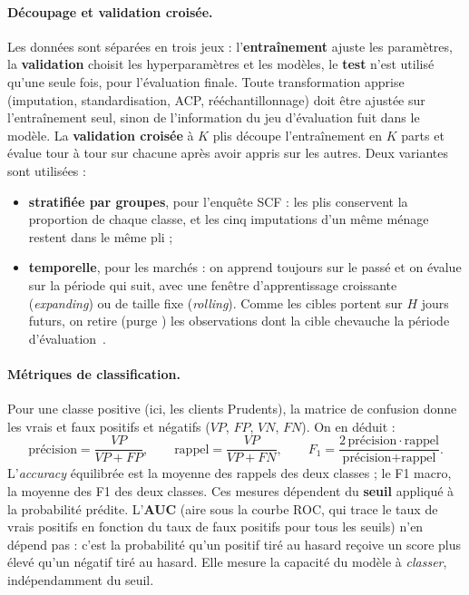 \paragraph{Découpage et validation croisée.} Les données sont séparées en trois jeux : l'\textbf{entraînement} ajuste les paramètres, la \textbf{validation} choisit les hyperparamètres et les modèles, le \textbf{test} n'est utilisé qu'une seule fois, pour l'évaluation finale. Toute transformation apprise (imputation, standardisation, ACP, rééchantillonnage) doit être ajustée sur l'entraînement seul, sinon de l'information du jeu d'évaluation \og fuit \fg{} dans le modèle. La \textbf{validation croisée} à $K$ plis découpe l'entraînement en $K$ parts et évalue tour à tour sur chacune après avoir appris sur les autres. Deux variantes sont utilisées :
\begin{itemize}
  \item \textbf{stratifiée par groupes}, pour l'enquête SCF : les plis conservent la proportion de chaque classe, et les cinq imputations d'un même ménage restent dans le même pli ;
  \item \textbf{temporelle}, pour les marchés : on apprend toujours sur le passé et on évalue sur la période qui suit, avec une fenêtre d'apprentissage croissante (\emph{expanding}) ou de taille fixe (\emph{rolling}). Comme les cibles portent sur $H$ jours futurs, on retire (\og purge \fg{}) les observations dont la cible chevauche la période d'évaluation~\cite{lopezdeprado2018}.
\end{itemize}

\paragraph{Métriques de classification.} Pour une classe positive (ici, les clients Prudents), la matrice de confusion donne les vrais et faux positifs et négatifs ($VP$, $FP$, $VN$, $FN$). On en déduit :
\begin{equation}
  \text{précision} = \frac{VP}{VP+FP}, \qquad \text{rappel} = \frac{VP}{VP+FN}, \qquad F_1 = \frac{2\,\text{précision}\cdot\text{rappel}}{\text{précision}+\text{rappel}}.
\end{equation}
L'\emph{accuracy} équilibrée est la moyenne des rappels des deux classes ; le F1 macro, la moyenne des F1 des deux classes. Ces mesures dépendent du \textbf{seuil} appliqué à la probabilité prédite. L'\textbf{AUC} (aire sous la courbe ROC, qui trace le taux de vrais positifs en fonction du taux de faux positifs pour tous les seuils) n'en dépend pas : c'est la probabilité qu'un positif tiré au hasard reçoive un score plus élevé qu'un négatif tiré au hasard. Elle mesure la capacité du modèle à \emph{classer}, indépendamment du seuil.

